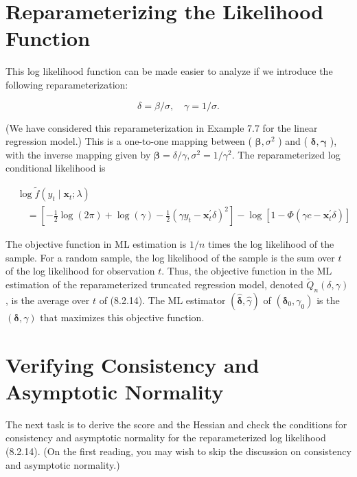 \documentclass[10pt]{article}
\begin{document}
\section*{Reparameterizing the Likelihood Function}
This log likelihood function can be made easier to analyze if we introduce the following reparameterization:


\begin{equation*}
\delta=\beta / \sigma, \quad \gamma=1 / \sigma . \tag{8.2.13}
\end{equation*}


(We have considered this reparameterization in Example 7.7 for the linear regression model.) This is a one-to-one mapping between ( $\boldsymbol{\beta}, \sigma^{2}$ ) and ( $\boldsymbol{\delta}, \boldsymbol{\gamma}$ ), with the inverse mapping given by $\boldsymbol{\beta}=\delta / \gamma, \sigma^{2}=1 / \gamma^{2}$. The reparameterized log\\
conditional likelihood is


\begin{align*}
& \log \tilde{f}\left(y_{t} \mid \mathbf{x}_{t} ; \lambda\right) \\
& \quad=\left[-\frac{1}{2} \log (2 \pi)+\log (\gamma)-\frac{1}{2}\left(\gamma y_{t}-\mathbf{x}_{t}^{\prime} \delta\right)^{2}\right]-\log \left[1-\Phi\left(\gamma c-\mathbf{x}_{t}^{\prime} \delta\right)\right] \tag{8.2.14}
\end{align*}


The objective function in ML estimation is $1 / n$ times the log likelihood of the sample. For a random sample, the log likelihood of the sample is the sum over $t$ of the log likelihood for observation $t$. Thus, the objective function in the ML estimation of the reparameterized truncated regression model, denoted $\widetilde{Q}_{n}(\delta, \gamma)$, is the average over $t$ of (8.2.14). The ML estimator $(\hat{\boldsymbol{\delta}}, \hat{\gamma})$ of $\left(\boldsymbol{\delta}_{0}, \gamma_{0}\right)$ is the $(\boldsymbol{\delta}, \gamma)$ that maximizes this objective function.

\section*{Verifying Consistency and Asymptotic Normality}
The next task is to derive the score and the Hessian and check the conditions for consistency and asymptotic normality for the reparameterized log likelihood (8.2.14). (On the first reading, you may wish to skip the discussion on consistency and asymptotic normality.)
\end{document}
